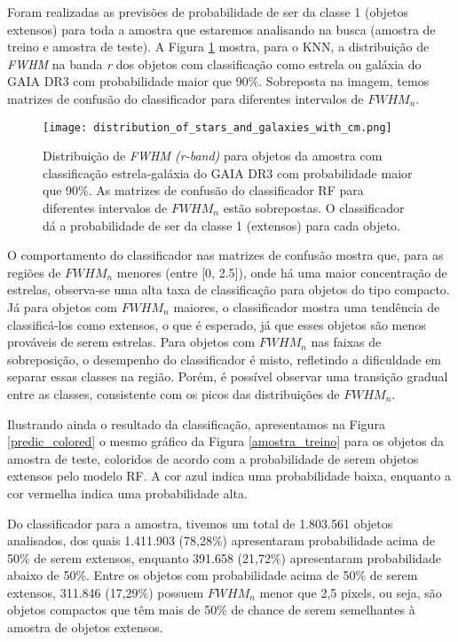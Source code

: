Foram realizadas as previsões de probabilidade de ser da classe 1 (objetos extensos) para toda a amostra que estaremos analisando na busca (amostra de treino e amostra de teste). A Figura \ref{probabilidade_extensos_fwhm} mostra, para o KNN, a distribuição de \textit{FWHM} na banda \textit{r} dos objetos com classificação como estrela ou galáxia do GAIA DR3 com probabilidade maior que 90\%. Sobreposta na imagem, temos matrizes de confusão do classificador para diferentes intervalos de $\textit{FWHM}_n$.

\begin{figure}[!ht]
    \centering
    \texttt{[image: distribution\_of\_stars\_and\_galaxies\_with\_cm.png]}
    \caption[]{Distribuição de \textit{FWHM (r-band)} para objetos da amostra com classificação estrela-galáxia do GAIA DR3 com probabilidade maior que 90\%. As matrizes de confusão do classificador RF para diferentes intervalos de $\textit{FWHM}_n$ estão sobrepostas. O classificador dá a probabilidade de ser da classe 1 (extensos) para cada objeto. }
    \label{probabilidade_extensos_fwhm}
\end{figure}

O comportamento do classificador nas matrizes de confusão mostra que, para as regiões de $\textit{FWHM}_n$ menores (entre [0, 2.5]), onde há uma maior concentração de estrelas, observa-se uma alta taxa de classificação para objetos do tipo compacto. Já para objetos com $\textit{FWHM}_n$ maiores, o classificador mostra uma tendência de classificá-los como extensos, o que é esperado, já que esses objetos são menos prováveis de serem estrelas. Para objetos com $\textit{FWHM}_n$ nas faixas de sobreposição, o desempenho do classificador é misto, refletindo a dificuldade em separar essas classes na região. Porém, é possível observar uma transição gradual entre as classes, consistente com os picos das distribuições de $\textit{FWHM}_n$.

Ilustrando ainda o resultado da classificação, apresentamos na Figura \ref{predic_colored} o mesmo gráfico da Figura \ref{amostra_treino} para os objetos da amostra de teste, coloridos de acordo com a probabilidade de serem objetos extensos pelo modelo RF. A cor azul indica uma probabilidade baixa, enquanto a cor vermelha indica uma probabilidade alta. 

Do classificador para a amostra, tivemos um total de 1.803.561 objetos analisados, dos quais 1.411.903 (78,28\%) apresentaram probabilidade acima de 50\% de serem extensos, enquanto 391.658 (21,72\%) apresentaram probabilidade abaixo de 50\%. Entre os objetos com probabilidade acima de 50\% de serem extensos, 311.846 (17,29\%) possuem $\textit{FWHM}_n$ menor que 2,5 pixels, ou seja, são objetos compactos que têm mais de 50\% de chance de serem semelhantes à amostra de objetos extensos.

